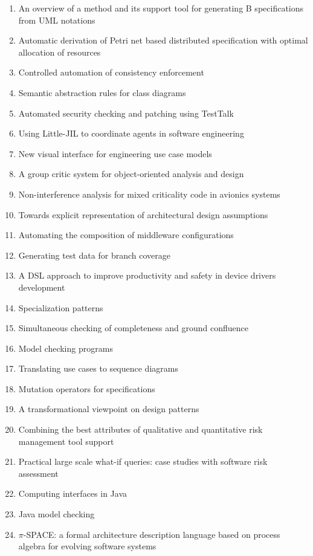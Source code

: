 \begin{enumerate}[itemsep=-1ex]
  \item An overview of a method and its support tool for generating B specifications from UML notations
  \item Automatic derivation of Petri net based distributed specification with optimal allocation of resources
  \item Controlled automation of consistency enforcement
  \item Semantic abstraction rules for class diagrams
  \item Automated security checking and patching using TestTalk
  \item Using Little-JIL to coordinate agents in software engineering
  \item New visual interface for engineering use case models
  \item A group critic system for object-oriented analysis and design
  \item Non-interference analysis for mixed criticality code in avionics systems
  \item Towards explicit representation of architectural design assumptions
  \item Automating the composition of middleware configurations
  \item Generating test data for branch coverage
  \item A DSL approach to improve productivity and safety in device drivers development
  \item Specialization patterns
  \item Simultaneous checking of completeness and ground confluence
  \item Model checking programs
  \item Translating use cases to sequence diagrams
  \item Mutation operators for specifications
  \item A transformational viewpoint on design patterns
  \item Combining the best attributes of qualitative and quantitative risk management tool support
  \item Practical large scale what-if queries: case studies with software risk assessment
  \item Computing interfaces in Java
  \item Java model checking
  \item $\pi$-SPACE: a formal architecture description language based on process algebra for evolving software systems

\end{enumerate}
